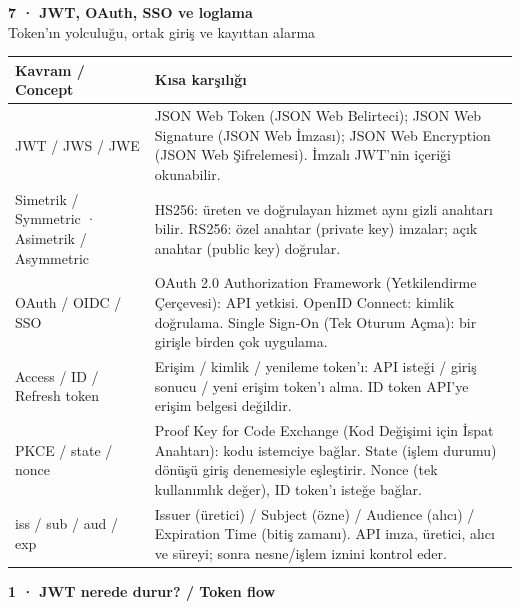 \documentclass[11pt,a4paper]{article}
\newcommand{\AltBaslik}[1]{\par\vspace{3pt}\textbf{#1}\par\nobreak}
\begin{document}
\newpage
\setlength{\parskip}{2pt}\renewcommand{\AltBaslik}[1]{\par\vspace{1pt}\textbf{#1}\par\nobreak}
{\Large\bfseries 7 · JWT, OAuth, SSO ve loglama}\\[3pt]
{\normalsize Token’ın yolculuğu, ortak giriş ve kayıttan alarma}\\[5pt]
\begingroup\small\begin{tabularx}{\linewidth}{@{}LY@{}}\toprule
Kavram / Concept & Kısa karşılığı\\\midrule
JWT / JWS / JWE & JSON Web Token (JSON Web Belirteci); JSON Web Signature (JSON Web İmzası); JSON Web Encryption (JSON Web Şifrelemesi). İmzalı JWT’nin içeriği okunabilir.\\[2pt]
Simetrik / Symmetric · Asimetrik / Asymmetric & HS256: üreten ve doğrulayan hizmet aynı gizli anahtarı bilir. RS256: özel anahtar (private key) imzalar; açık anahtar (public key) doğrular.\\[2pt]
OAuth / OIDC / SSO & OAuth 2.0 Authorization Framework (Yetkilendirme Çerçevesi): API yetkisi. OpenID Connect: kimlik doğrulama. Single Sign-On (Tek Oturum Açma): bir girişle birden çok uygulama.\\[2pt]
Access / ID / Refresh token & Erişim / kimlik / yenileme token’ı: API isteği / giriş sonucu / yeni erişim token’ı alma. ID token API’ye erişim belgesi değildir.\\[2pt]
PKCE / state / nonce & Proof Key for Code Exchange (Kod Değişimi için İspat Anahtarı): kodu istemciye bağlar. State (işlem durumu) dönüşü giriş denemesiyle eşleştirir. Nonce (tek kullanımlık değer), ID token’ı isteğe bağlar.\\[2pt]
iss / sub / aud / exp & Issuer (üretici) / Subject (özne) / Audience (alıcı) / Expiration Time (bitiş zamanı). API imza, üretici, alıcı ve süreyi; sonra nesne/işlem iznini kontrol eder.\\[2pt]
\bottomrule\end{tabularx}\endgroup\par
\AltBaslik{1 · JWT nerede durur? / Token flow}
\end{document}
